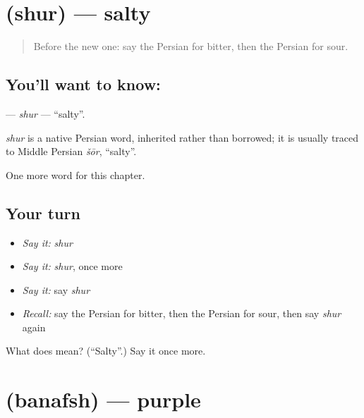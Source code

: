 \section[\texorpdfstring{\fa{شور} (shur)}{شور (shur)}]{ (shur) — salty}

\label{lesson:FA-C127-shur}



\begin{quote}
Before the new one: say the Persian for bitter, then the Persian for sour.
\end{quote}

\subsection*{You'll want to know: }
\textbf{} — \emph{shur} — \textquotedblleft{}salty\textquotedblright{}.

\begin{cousinweb}
\emph{shur} is a native Persian word, inherited rather than borrowed; it is usually traced to Middle Persian \emph{šōr}, \textquotedblleft{}salty\textquotedblright{}.
\end{cousinweb}

\begin{grammarlens}[title={What you've built}]
One more word for this chapter.
\end{grammarlens}

\subsection*{Your turn}
\begin{itemize}
\raggedright
  \item \emph{Say it:} \emph{shur}
  \item \emph{Say it:} \emph{shur}, once more
  \item \emph{Say it:} say \emph{shur}
  \item \emph{Recall:} say the Persian for bitter, then the Persian for sour, then say \emph{shur} again
\end{itemize}

\begin{tcolorbox}[breakable,colback=teal!4,colframe=teal!35!black,title={Before you move on}]
What does  mean? (\textquotedblleft{}Salty\textquotedblright{}.) Say it once more.
\end{tcolorbox}
\section[\texorpdfstring{\fa{بنفش} (banafsh)}{بنفش (banafsh)}]{ (banafsh) — purple}

